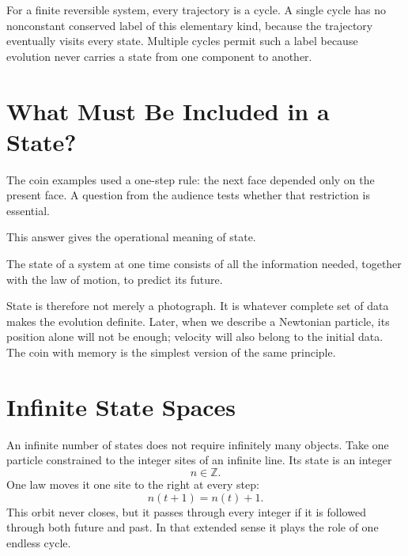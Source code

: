 For a finite reversible system, every trajectory is a cycle.  A single cycle
has no nonconstant conserved label of this elementary kind, because the
trajectory eventually visits every state.  Multiple cycles permit such a
label because evolution never carries a state from one component to another.

\section{What Must Be Included in a State?}

The coin examples used a one-step rule: the next face depended only on the
present face.  A question from the audience tests whether that restriction is
essential.

\begin{classroomqa}

\end{classroomqa}

This answer gives the operational meaning of state.

\begin{definition}
The state of a system at one time consists of all the information needed,
together with the law of motion, to predict its future.
\end{definition}

State is therefore not merely a photograph.  It is whatever complete set of
data makes the evolution definite.  Later, when we describe a Newtonian
particle, its position alone will not be enough; velocity will also belong to
the initial data.  The coin with memory is the simplest version of the same
principle.

\section{Infinite State Spaces}

An infinite number of states does not require infinitely many objects.  Take
one particle constrained to the integer sites of an infinite line.  Its state
is an integer
\[
  n\in\mathbb Z.
\]
One law moves it one site to the right at every step:
\begin{equation}
  n(t+1)=n(t)+1.
  \label{eq:lattice-one}
\end{equation}
This orbit never closes, but it passes through every integer if it is followed
through both future and past.  In that extended sense it plays the role of one
endless cycle.

